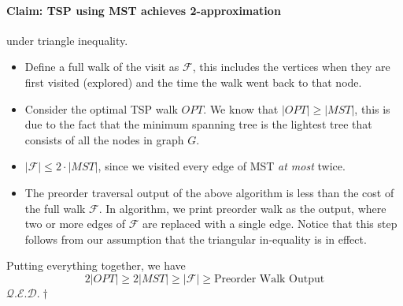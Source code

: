 \documentclass[10pt]{article}
\newcommand{\qed}{\hfill $\mathcal{Q}.\mathcal{E}.\mathcal{D}.\dagger$}
\begin{document}
\paragraph{Claim: TSP using MST achieves 2-approximation} under triangle inequality. 
\begin{itemize}
    \item Define a full walk of the visit as $\mathcal{F}$, this includes the vertices when  they are first visited (explored) and the time the walk went back to that node. 
    \item Consider the optimal TSP walk $OPT$. We know that $|OPT|\geq |MST|$, this is due to the fact that the minimum spanning tree is the lightest tree that consists of all the nodes in graph $G$. 
    \item $|\mathcal{F}|\leq 2 \cdot |MST|$, since we visited every edge of MST \textit{at most} twice.
    \item The preorder traversal output of the above algorithm is less than the cost of the full walk $\mathcal{F}$. In algorithm, we print preorder walk as the output, where two or more edges of $\mathcal{F}$ are replaced with a single edge. Notice that this step follows from our assumption that the triangular in-equality is in effect. 
\end{itemize}
Putting everything together, we have
\begin{equation*}
    2 |OPT| \geq 2 |MST| \geq |\mathcal{F}| \geq \text{Preorder Walk Output}
\end{equation*}
\qed
\end{document}
